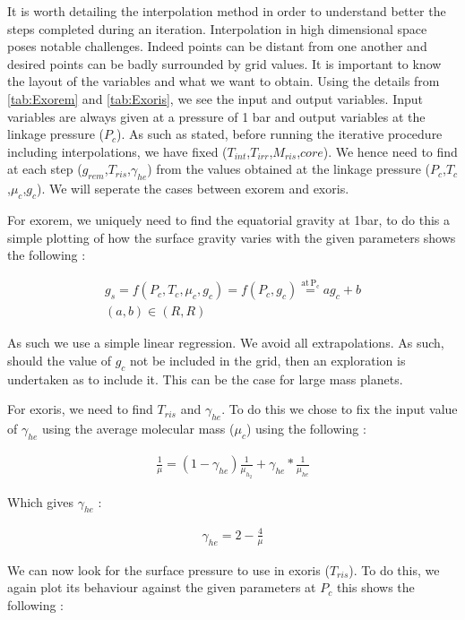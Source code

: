 It is worth detailing the interpolation method in order to understand better the steps completed during an iteration. Interpolation in high dimensional space poses notable challenges. Indeed points can be distant from one another and desired points can be badly surrounded by grid values. It is important to know the layout of the variables and what we want to obtain. Using the details from \cref{tab:Exorem} and \cref{tab:Exoris}, we see the input and output variables. Input variables are always given at a pressure of 1 bar and output variables at the linkage pressure ($P_c$). As such as stated, before running the iterative procedure including interpolations, we have fixed ($T_{int}$,$T_{irr}$,$M_{ris}$,$core$). We hence need to find at each step ($g_{rem}$,$T_{ris}$,$\gamma_{he}$) from the values obtained at the linkage pressure ($P_c$,$T_c$,$\mu_c$,$g_c$). We will seperate the cases between exorem and exoris.\par

For exorem, we uniquely need to find the equatorial gravity at 1bar, to do this a simple plotting of how the surface gravity varies with the given parameters shows the following :

\begin{align} 
    g_s = f(P_c,T_c,\mu_c,g_c) = f(P_c, g_c) \overset{\mathrm{at \, P_c}}{=} ag_c + b \\
    (a,b) \in (R,R) \nonumber
\end{align}

As such we use a simple linear regression. We avoid all extrapolations. As such, should the value of $g_c$ not be included in the grid, then an exploration is undertaken as to include it. This can be the case for large mass planets.\par

For exoris, we need to find $T_{ris}$ and $\gamma_{he}$. To do this we chose to fix the input value of $\gamma_{he}$ using the average molecular mass ($\mu_c$) using the following :

\begin{align} 
    \frac{1}{\mu} = (1-\gamma_{he})\frac{1}{\mu_{h_2}} + \gamma_{he}*\frac{1}{\mu_{he}}
\end{align}

Which gives $\gamma_{he}$ :

\begin{align} 
    \gamma_{he} = 2-\frac{4}{\mu}
\end{align}

We can now look for the surface pressure to use in exoris ($T_{ris}$). To do this, we again plot its behaviour against the given parameters at $P_c$ this shows the following :

